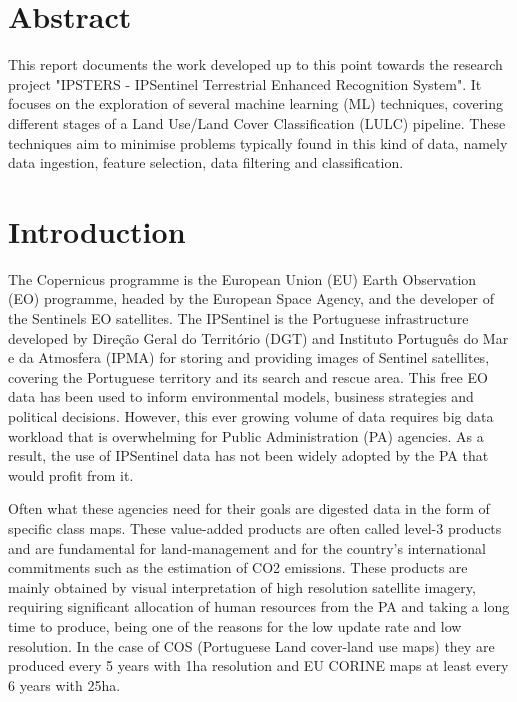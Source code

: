 \documentclass[12pt, english, openany]{book}
\begin{document}
\chapter*{Abstract}

This report documents the work developed up to this point towards the research
project "IPSTERS - IPSentinel Terrestrial Enhanced Recognition System". It
focuses on the exploration of several machine learning (ML) techniques,
covering different stages of a Land Use/Land Cover Classification (LULC)
pipeline. These techniques aim to minimise problems typically found in this
kind of data, namely data ingestion, feature selection, data filtering and
classification.



\tableofcontents{}

\clearpage

\listoffigures

\clearpage

\listoftables

\mainmatter

\chapter{Introduction}

The Copernicus programme is the European Union (EU) Earth Observation (EO)
programme, headed by the European Space Agency, and the developer of the
Sentinels EO satellites. The IPSentinel is the Portuguese infrastructure
developed by Direção Geral do Território (DGT) and Instituto Português do Mar e
da Atmosfera (IPMA) for storing and providing images of Sentinel satellites,
covering the Portuguese territory and its search and rescue area. This free EO
data has been used to inform environmental models, business strategies and
political decisions. However, this ever growing volume of data requires big
data workload that is overwhelming for Public Administration (PA) agencies. As
a result, the use of IPSentinel data has not been widely adopted by the PA that
would profit from it.

Often what these agencies need for their goals are digested data in the form of
specific class maps. These value-added products are often called level-3
products and are fundamental for land-management and for the country's
international commitments such as the estimation of CO2 emissions. These
products are mainly obtained by visual interpretation of high resolution
satellite imagery, requiring significant allocation of human resources from the
PA and taking a long time to produce, being one of the reasons for the low
update rate and low resolution. In the case of COS (Portuguese Land cover-land
use maps) they are produced every 5 years with 1ha resolution and EU CORINE
maps at least every 6 years with 25ha.
\end{document}
